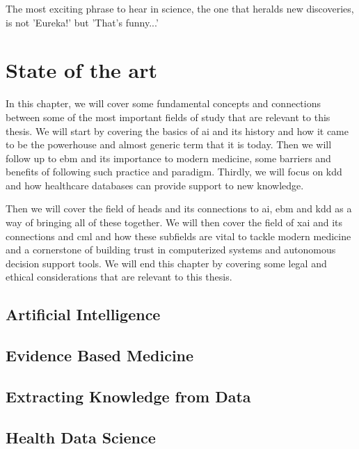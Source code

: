 \begin{savequote}[75mm]
The most exciting phrase to hear in science, the one that heralds new discoveries, is not 'Eureka!' but 'That's funny...'
\end{savequote}
\chapter{State of the art} \label{chap:sota}


In this chapter, we will cover some fundamental concepts and connections between some of the most important fields of study that are relevant to this thesis. We will start by covering the basics of \ac{ai} and its history and how it came to be the powerhouse and almost generic term that it is today. Then we will follow up to \ac{ebm} and its importance to modern medicine, some barriers and benefits of following such practice and paradigm. Thirdly, we will focus on \ac{kdd} and how healthcare databases can provide support to new knowledge.

Then we will cover the field of \ac{heads} and its connections to \ac{ai}, \ac{ebm} and \ac{kdd} as a way of bringing all of these together. We will then cover the field of \ac{xai} and its connections and \ac{cml} and how these subfields are vital to tackle modern medicine and a cornerstone of building trust in computerized systems and autonomous decision support tools. We will end this chapter by covering some legal and ethical considerations that are relevant to this thesis.


\section{Artificial Intelligence}


\section{Evidence Based Medicine}\label{subsec:ebm}




\section{Extracting Knowledge from Data}\label{sec:kdd}



\section{Health Data Science}

